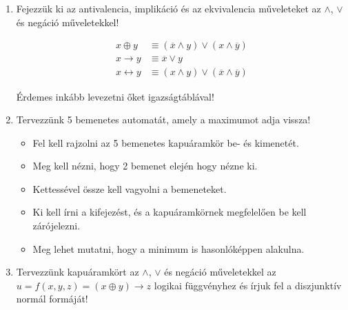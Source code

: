 \documentclass[a4paper]{article}
\newenvironment{solution}
{\color{RoyalBlue}}{\bigskip}
\begin{document}
\begin{enumerate}
\begin{solution}
\end{solution}

\item

Fejezzük ki az antivalencia, implikáció és az ekvivalencia műveleteket az $\wedge$, $\vee$ és negáció műveletekkel!

\begin{align*}
x \oplus y &\equiv (\overline{x} \wedge y) \vee (x \wedge \overline{y}) \\
x \rightarrow y &\equiv \overline{x} \vee y \\
x \leftrightarrow y &\equiv (x \wedge y) \vee (\overline{x} \wedge \overline{y})
\end{align*}

\begin{solution}
Érdemes inkább levezetni őket igazságtáblával!
\end{solution}

\item

Tervezzünk 5 bemenetes automatát, amely a maximumot adja vissza!

\begin{solution}
\begin{itemize}
\item Fel kell rajzolni az 5 bemenetes kapuáramkör be- és kimenetét.
\item Meg kell nézni, hogy 2 bemenet elején hogy nézne ki.
\item Kettessével össze kell vagyolni a bemeneteket.
\item Ki kell írni a kifejezést, és a kapuáramkörnek megfelelően be kell zárójelezni.
\item Meg lehet mutatni, hogy a minimum is hasonlóképpen alakulna.
\end{itemize}
\end{solution}

\item

Tervezzünk kapuáramkört az $\wedge$, $\vee$ és negáció műveletekkel az $u = f(x, y, z) = (x \oplus y) \rightarrow z$ logikai függvényhez és írjuk fel a diszjunktív normál formáját!

\begin{solution}


\end{solution}
\end{enumerate}
\end{document}
